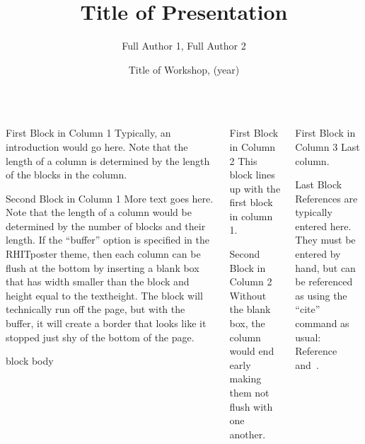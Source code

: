 \documentclass[t,12pt]{beamer}
\title{Title of Presentation}
\author{Full Author 1, Full Author 2}
\institute{Department, University}
\date{Title of Workshop, (year)}
\begin{document}
\begin{frame}\begin{columns}[t]

\begin{column}{0.33\textwidth}
  \begin{block}{First Block in Column 1}
    Typically, an introduction would go here.  Note that the length of a 
    column is determined by the length of the blocks in the column.
  \end{block}

  \begin{block}{Second Block in Column 1}
  		More text goes here.  Note that the length of a column would be determined
		by the number of blocks and their length. If the ``buffer'' option is 
		specified in the RHITposter theme, then each column can be flush at the
		bottom by inserting a blank box that has width smaller than the block and
		height equal to the textheight. The block will technically run off the page,
		but with the buffer, it will create a border that looks like it stopped just
		shy of the bottom of the page.
		
		\begin{beamercolorbox}[wd=1ex,ht=\textheight]{block body}
		\end{beamercolorbox}
	\end{block}
\end{column}


\begin{column}{0.33\textwidth}
  \begin{block}{First Block in Column 2}
    This block lines up with the first block in column 1.

  \end{block}
  
  \begin{block}{Second Block in Column 2}
  		Without the blank box, the column would end early making them not flush
		with one another.
	\end{block}
\end{column}


\begin{column}{0.33\textwidth}
	\begin{block}{First Block in Column 3}
    Last column. 
  \end{block}

	\begin{block}{Last Block}
		References are typically entered here.  They must be entered by hand, but
		can be referenced as using the ``cite'' command as usual: 
		Reference~\cite{Example1ref} and~\cite{Example2ref}.
		

\end{block}
\end{column}
\end{columns}
\end{frame}
\end{document}

